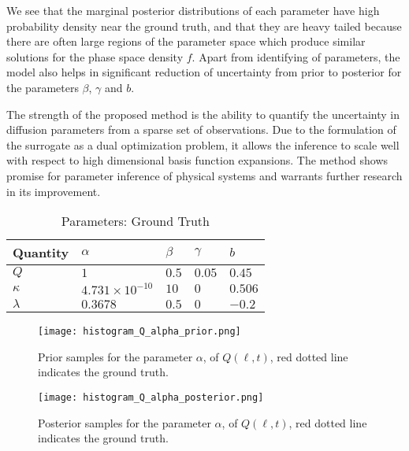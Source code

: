 We see that the marginal posterior distributions of each parameter have high probability density 
near the ground truth, and that they are heavy tailed because there are often large regions of the 
parameter space which produce similar solutions for the phase space density $f$. Apart from 
identifying of parameters, the model also helps in significant reduction of uncertainty from prior 
to posterior for the parameters $\beta$, $\gamma$ and $b$.

The strength of the proposed method is the ability to quantify the uncertainty in diffusion 
parameters from a sparse set of observations. Due to the formulation of the surrogate as a dual 
optimization problem, it allows the inference to scale well with respect to high dimensional basis 
function expansions. The method shows promise for parameter inference of physical systems and 
warrants further research in its improvement.


\begin{table}[t]
  \caption{Parameters: Ground Truth}
  \label{tab:ground-truth}
  \centering
  \begin{tabular}{lllll}
    \hline
    \textbf{Quantity}     & $\alpha$     & $\beta$ & $\gamma$ & $b$ \\
    \hline
    $Q$ & $1$  & $0.5$ & $0.05$  & $0.45$     \\
    $\kappa$  & $4.731 \times 10^{-10}$ & $10$  & $0$ & $0.506$ \\
    $\lambda$ & $0.3678$ & $0.5$  & $0$ & $-0.2$ \\
    \hline
  \end{tabular}
\end{table}

\begin{figure*}[!htb]
  \centering
  \begin{subfigure}[b]{0.75\textwidth}
    \centering
    \texttt{[image: histogram\_Q\_alpha\_prior.png]}
    \caption{ 
      Prior samples for the parameter $\alpha$, of $Q(\ell, t)$, 
      red dotted line indicates the ground truth.
    }
    \label{fig:alphaprior}
  \end{subfigure}
  \hfill
  \begin{subfigure}[b]{0.75\textwidth}
    \centering
    \texttt{[image: histogram\_Q\_alpha\_posterior.png]}
    \caption{
      Posterior samples for the parameter $\alpha$, of $Q(\ell, t)$, 
      red dotted line indicates the ground truth.}
    \label{fig:alpha}
  \end{subfigure}
\end{figure*}


